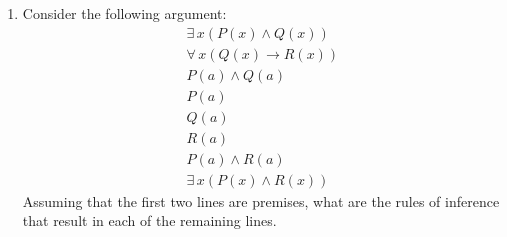 \documentclass[letterpaper,12pt,fleqn]{article}
\renewcommand{\implies}{\rightarrow}
\begin{document}
\begin{enumerate}[left=0in,itemsep=0.5in]
\item Consider the following argument:
  \begin{gather*}
    \exists\,x(P(x)\land Q(x)) \\
    \forall\,x(Q(x)\implies R(x)) \\
    P(a)\land Q(a) \\
    P(a) \\
    Q(a) \\
    R(a) \\
    P(a)\land R(a) \\
    \exists\,x(P(x)\land R(x))
  \end{gather*}
  Assuming that the first two lines are premises, what are the rules of inference that result in each of the
  remaining lines.
\end{enumerate}
\end{document}
